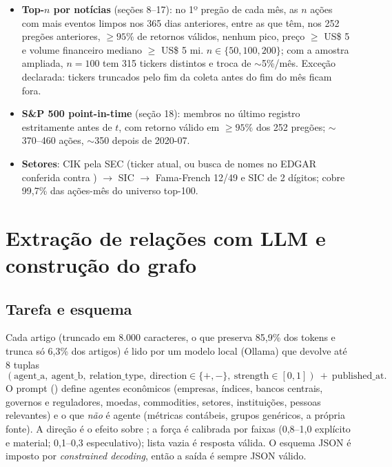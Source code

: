 \documentclass[11pt,a4paper]{article}
\begin{document}
\begin{itemize}
  \item \textbf{Top-$n$ por notícias} (seções 8--17): no 1º pregão de cada mês, as $n$ ações com mais eventos
        limpos nos 365 dias anteriores, entre as que têm, nos 252 pregões anteriores, $\ge 95\%$ de
        retornos válidos, nenhum pico, preço $\ge$ US\$ 5 e volume financeiro mediano $\ge$ US\$ 5 mi.
        $n\in\{50,100,200\}$; com a amostra ampliada, $n=100$ tem 315 tickers distintos e troca de
        $\sim$5\%/mês. Exceção declarada: tickers truncados pelo fim da coleta antes do fim do mês ficam fora.
  \item \textbf{S\&P 500 point-in-time} (seção 18): membros no último registro estritamente antes de $t$,
        com retorno válido em $\ge 95\%$ dos 252 pregões; $\sim$370--460 ações, $\sim$350 depois de 2020-07.
  \item \textbf{Setores}: CIK pela SEC (ticker atual, ou busca de nomes no EDGAR conferida contra
        ) $\to$ SIC $\to$ Fama-French 12/49 e SIC de 2 dígitos; cobre 99,7\% das
        ações-mês do universo top-100.
\end{itemize}

\section{Extração de relações com LLM e construção do grafo}\label{sec:extracao}

\subsection{Tarefa e esquema}

Cada artigo (truncado em 8.000 caracteres, o que preserva 85,9\% dos tokens e trunca só 6,3\% dos
artigos) é lido por um modelo local (Ollama) que devolve até 8 tuplas
\[
(\text{agent\_a},\ \text{agent\_b},\ \text{relation\_type},\ \text{direction}\in\{+,-\},\ \text{strength}\in[0,1])
\ +\ \text{published\_at}.
\]
O prompt () define agentes econômicos (empresas, índices, bancos centrais,
governos e reguladores, moedas, commodities, setores, instituições, pessoas relevantes) e o que
\emph{não} é agente (métricas contábeis, grupos genéricos, a própria fonte). A direção é o efeito
sobre ; a força é calibrada por faixas (0,8--1,0 explícito e material; 0,1--0,3
especulativo); lista vazia é resposta válida. O esquema JSON é imposto por \emph{constrained
decoding}, então a saída é sempre JSON válido.
\end{document}
